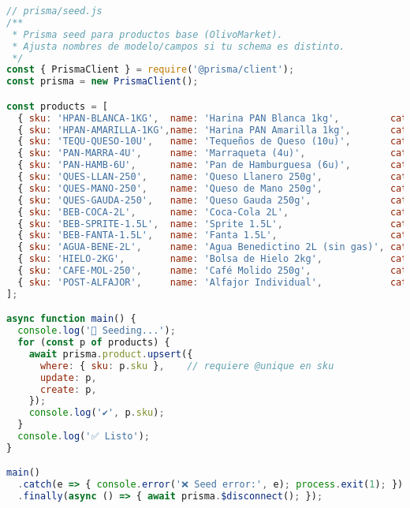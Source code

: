 \documentclass[11pt]{article}
\begin{document}
\begin{lstlisting}[language=JavaScript]
// prisma/seed.js
/**
 * Prisma seed para productos base (OlivoMarket).
 * Ajusta nombres de modelo/campos si tu schema es distinto.
 */
const { PrismaClient } = require('@prisma/client');
const prisma = new PrismaClient();

const products = [
  { sku: 'HPAN-BLANCA-1KG',  name: 'Harina PAN Blanca 1kg',         category: 'Abarrotes',  priceCLP: 2000, stock: 30 },
  { sku: 'HPAN-AMARILLA-1KG',name: 'Harina PAN Amarilla 1kg',       category: 'Abarrotes',  priceCLP: 2000, stock: 25 },
  { sku: 'TEQU-QUESO-10U',   name: 'Tequeños de Queso (10u)',       category: 'Congelados', priceCLP: 4500, stock: 20 },
  { sku: 'PAN-MARRA-4U',     name: 'Marraqueta (4u)',               category: 'Panadería',  priceCLP: 1200, stock: 15 },
  { sku: 'PAN-HAMB-6U',      name: 'Pan de Hamburguesa (6u)',       category: 'Panadería',  priceCLP: 1500, stock: 12 },
  { sku: 'QUES-LLAN-250',    name: 'Queso Llanero 250g',            category: 'Quesos',     priceCLP: 4500, stock: 10 },
  { sku: 'QUES-MANO-250',    name: 'Queso de Mano 250g',            category: 'Quesos',     priceCLP: 5000, stock: 10 },
  { sku: 'QUES-GAUDA-250',   name: 'Queso Gauda 250g',              category: 'Quesos',     priceCLP: 3800, stock: 14 },
  { sku: 'BEB-COCA-2L',      name: 'Coca-Cola 2L',                  category: 'Bebidas',    priceCLP: 1800, stock: 40 },
  { sku: 'BEB-SPRITE-1.5L',  name: 'Sprite 1.5L',                   category: 'Bebidas',    priceCLP: 1500, stock: 36 },
  { sku: 'BEB-FANTA-1.5L',   name: 'Fanta 1.5L',                    category: 'Bebidas',    priceCLP: 1500, stock: 36 },
  { sku: 'AGUA-BENE-2L',     name: 'Agua Benedictino 2L (sin gas)', category: 'Agua',       priceCLP: 1100, stock: 30 },
  { sku: 'HIELO-2KG',        name: 'Bolsa de Hielo 2kg',            category: 'Hielo',      priceCLP: 1200, stock: 22 },
  { sku: 'CAFE-MOL-250',     name: 'Café Molido 250g',              category: 'Café',       priceCLP: 3500, stock: 18 },
  { sku: 'POST-ALFAJOR',     name: 'Alfajor Individual',            category: 'Postres',    priceCLP: 900,  stock: 24 },
];

async function main() {
  console.log('🌱 Seeding...');
  for (const p of products) {
    await prisma.product.upsert({
      where: { sku: p.sku },    // requiere @unique en sku
      update: p,
      create: p,
    });
    console.log('✔', p.sku);
  }
  console.log('✅ Listo');
}

main()
  .catch(e => { console.error('❌ Seed error:', e); process.exit(1); })
  .finally(async () => { await prisma.$disconnect(); });
\end{lstlisting}
\end{document}
